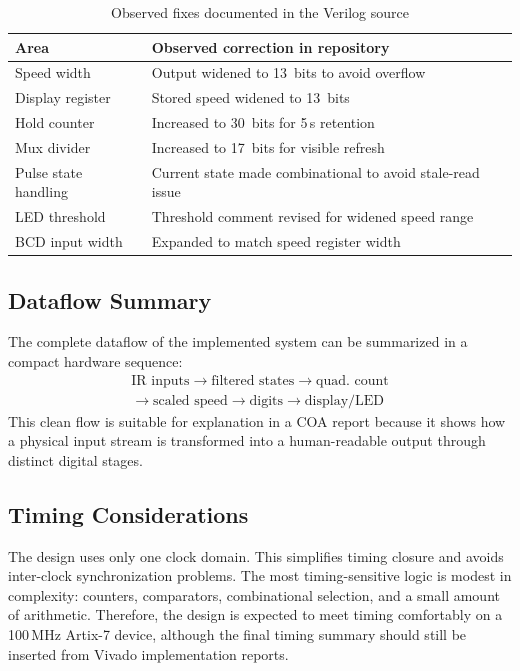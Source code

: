 \documentclass[conference,a4paper]{IEEEtran}
\begin{document}
\begin{table}[H]
\caption{Observed fixes documented in the Verilog source}
\centering
\begin{tabular}{|p{2.2cm}|p{5.0cm}|}
\hline
\textbf{Area} & \textbf{Observed correction in repository} \\
\hline
Speed width         & Output widened to 13~bits to avoid overflow \\
\hline
Display register    & Stored speed widened to 13~bits \\
\hline
Hold counter        & Increased to 30~bits for 5\,s retention \\
\hline
Mux divider         & Increased to 17~bits for visible refresh \\
\hline
Pulse state handling & Current state made combinational to avoid stale-read issue \\
\hline
LED threshold       & Threshold comment revised for widened speed range \\
\hline
BCD input width     & Expanded to match speed register width \\
\hline
\end{tabular}
\end{table}

\subsection{Dataflow Summary}
The complete dataflow of the implemented system can be summarized in a compact hardware sequence:
\begin{equation}
\begin{split}
\text{IR inputs} \rightarrow \text{filtered states} \rightarrow \text{quad. count} \\
\rightarrow \text{scaled speed} \rightarrow \text{digits} \rightarrow \text{display/LED}
\end{split}
\end{equation}
This clean flow is suitable for explanation in a COA report because it shows how a physical input stream is transformed into a human-readable output through distinct digital stages.

\subsection{Timing Considerations}
The design uses only one clock domain. This simplifies timing closure and avoids inter-clock synchronization problems. The most timing-sensitive logic is modest in complexity: counters, comparators, combinational selection, and a small amount of arithmetic. Therefore, the design is expected to meet timing comfortably on a 100\,MHz Artix-7 device, although the final timing summary should still be inserted from Vivado implementation reports.
\end{document}
